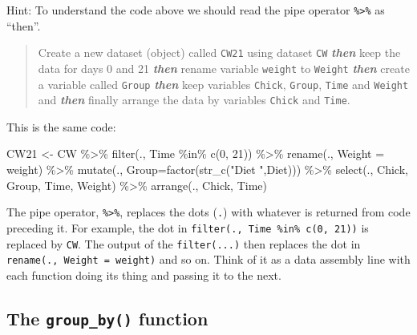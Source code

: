 \documentclass[
  letterpaper,
  DIV=11,
  numbers=noendperiod]{scrreprt}
\newenvironment{Shaded}{\begin{snugshade}}{\end{snugshade}}
\newcommand{\AttributeTok}[1]{\textcolor[rgb]{0.40,0.45,0.13}{#1}}
\newcommand{\DecValTok}[1]{\textcolor[rgb]{0.68,0.00,0.00}{#1}}
\newcommand{\FunctionTok}[1]{\textcolor[rgb]{0.28,0.35,0.67}{#1}}
\newcommand{\NormalTok}[1]{\textcolor[rgb]{0.00,0.23,0.31}{#1}}
\newcommand{\OtherTok}[1]{\textcolor[rgb]{0.00,0.23,0.31}{#1}}
\newcommand{\SpecialCharTok}[1]{\textcolor[rgb]{0.37,0.37,0.37}{#1}}
\newcommand{\StringTok}[1]{\textcolor[rgb]{0.13,0.47,0.30}{#1}}
\theoremstyle{definition}
\theoremstyle{plain}
\theoremstyle{plain}
\theoremstyle{remark}
\begin{document}
Hint: To understand the code above we should read the pipe operator
\texttt{\%\textgreater{}\%} as ``then''.

\begin{quote}
Create a new dataset (object) called \texttt{CW21} using dataset
\texttt{CW} \textbf{\emph{then}} keep the data for days 0 and 21
\textbf{\emph{then}} rename variable \texttt{weight} to \texttt{Weight}
\textbf{\emph{then}} create a variable called \texttt{Group}
\textbf{\emph{then}} keep variables \texttt{Chick}, \texttt{Group},
\texttt{Time} and \texttt{Weight} and \textbf{\emph{then}} finally
arrange the data by variables \texttt{Chick} and \texttt{Time}.
\end{quote}

This is the same code:

\begin{Shaded}
\begin{Highlighting}[]
\NormalTok{CW21 }\OtherTok{\textless{}{-}}\NormalTok{ CW }\SpecialCharTok{\%\textgreater{}\%} 
  \FunctionTok{filter}\NormalTok{(., Time }\SpecialCharTok{\%in\%} \FunctionTok{c}\NormalTok{(}\DecValTok{0}\NormalTok{, }\DecValTok{21}\NormalTok{)) }\SpecialCharTok{\%\textgreater{}\%} 
  \FunctionTok{rename}\NormalTok{(., }\AttributeTok{Weight =}\NormalTok{ weight) }\SpecialCharTok{\%\textgreater{}\%} 
  \FunctionTok{mutate}\NormalTok{(., }\AttributeTok{Group=}\FunctionTok{factor}\NormalTok{(}\FunctionTok{str\_c}\NormalTok{(}\StringTok{"Diet "}\NormalTok{,Diet))) }\SpecialCharTok{\%\textgreater{}\%} 
  \FunctionTok{select}\NormalTok{(., Chick, Group, Time, Weight) }\SpecialCharTok{\%\textgreater{}\%} 
  \FunctionTok{arrange}\NormalTok{(., Chick, Time) }
\end{Highlighting}
\end{Shaded}

The pipe operator, \texttt{\%\textgreater{}\%}, replaces the dots
(\texttt{.}) with whatever is returned from code preceding it. For
example, the dot in \texttt{filter(.,\ Time\ \%in\%\ c(0,\ 21))} is
replaced by \texttt{CW}. The output of the \texttt{filter(...)} then
replaces the dot in \texttt{rename(.,\ Weight\ =\ weight)} and so on.
Think of it as a data assembly line with each function doing its thing
and passing it to the next.

\hypertarget{the-group_by-function}{%
\subsection{\texorpdfstring{The \texttt{group\_by()}
function}{The group\_by() function}}\label{the-group_by-function}}
\end{document}
